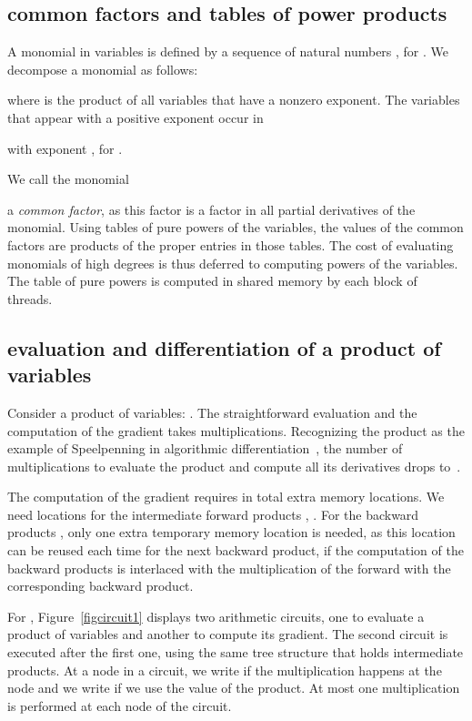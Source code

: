 \documentclass{article}
\begin{document}
\subsection{common factors and tables of power products}
A monomial in  variables is defined by a sequence of 
natural numbers , for .
We decompose a monomial as follows:

where  is the product of all 
variables that have a nonzero exponent.
The  variables that appear with a positive exponent
occur in

with exponent , for .

We call the monomial

a {\em common factor}, as this factor is a factor in all partial
derivatives of the monomial.
Using tables of pure powers of the variables, the values of the 
common factors are products of the proper entries in those tables.
The cost of evaluating monomials of high degrees is thus deferred
to computing powers of the variables.
The table of pure powers is computed in shared memory 
by each block of threads.

\subsection{evaluation and differentiation of a product of variables}
Consider a product of variables: .
The straightforward evaluation and the computation of the gradient
takes  multiplications.
Recognizing the product as the example of Speelpenning in algorithmic
differentiation~\cite{GW08}, 
the number of multiplications to evaluate the product
and compute all its derivatives drops to~.

The computation of the gradient requires in total  
extra memory locations.  We need  locations for the intermediate 
forward products , 
.
For the backward products , 
 only one extra temporary memory location
is needed, as this location can be reused each time for the next
backward product, if the computation of the backward products is
interlaced with the multiplication of the forward with the 
corresponding backward product.

For ,
Figure~\ref{figcircuit1} displays two arithmetic circuits,
one to evaluate a product of variables and another to compute its gradient.
The second circuit is executed after the first one, using the same
tree structure that holds intermediate products.
At a node in a circuit, we write  
if the multiplication  happens at the node
and we write  if we use the value of the product.
At most one multiplication is performed at each node of the circuit.
\end{document}
